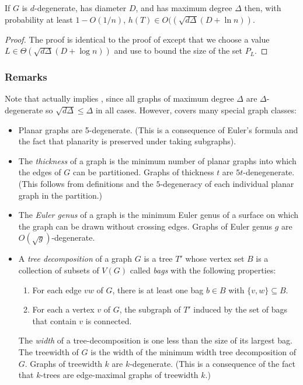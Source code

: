 \documentclass[lotsofwhite]{patmorin}
\begin{document}
\begin{thm}
  If $G$ is $d$-degenerate, has diameter $D$, and has maximum degree
  $\Delta$ then, with probability at least $1-O(1/n)$, $h(T)\in
  O((\sqrt{d\Delta}(D+\ln n))$.
\end{thm}

\begin{proof}
  The proof is identical to the proof of 
  except that we choose a value $L \in \Theta(\sqrt{d\Delta}(D+\log n))$ and use
   to bound the size of the set $P_L$.
\end{proof}


\subsubsection{Remarks}

Note that  actually implies
, since all graphs of maximum degree $\Delta$
are $\Delta$-degenerate so $\sqrt{d\Delta}\le \Delta$ in all cases.
However,  covers many special
graph classes:

\begin{itemize}
  \item Planar graphs are 5-degenerate. (This is a consequence of Euler's
    formula and the fact that planarity is preserved under taking subgraphs).
  
  \item The \emph{thickness} of a graph is the minimum number of planar
    graphs into which the edges of $G$ can be partitioned. Graphs of
    thickness $t$ are $5t$-denegenerate.  (This follows from definitions
    and the $5$-degeneracy of each individual planar graph in the
    partition.)

  \item The \emph{Euler genus} of a graph is the minimum Euler genus of
    a surface on which the graph can be drawn without crossing edges.  Graphs of
    Euler genus $g$ are $O(\sqrt{g})$-degenerate.

  \item A \emph{tree decomposition} of a graph $G$ is a tree $T'$ whose
  vertex set $B$ is a collection of subsets of $V(G)$ called \emph{bags}
  with the following properties:
  \begin{enumerate}
    \item For each edge $vw$ of $G$, there is at least one bag $b\in B$
      with $\{v,w\}\subseteq B$.
    \item For each a vertex $v$ of $G$, the subgraph of $T'$ induced by
      the set of bags that contain $v$ is connected.
  \end{enumerate}
  The \emph{width} of a tree-decomposition is one less than the size
  of its largest bag.  The treewidth of $G$ is the width of the minimum
  width tree decomposition of $G$.
  Graphs of treewidth $k$ are $k$-degenerate. (This is a consequence
  of the fact that $k$-trees are edge-maximal graphs of treewidth $k$.)
\end{itemize} 
\end{document}

